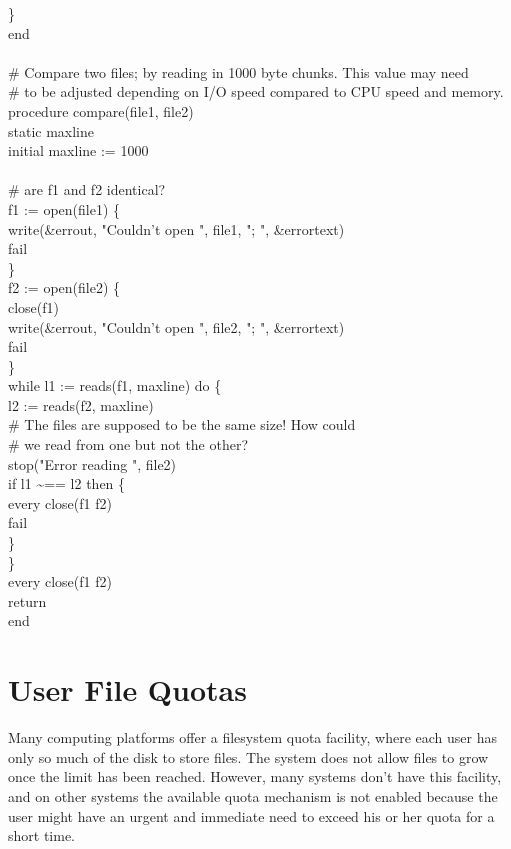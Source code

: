 {\>\>\} \\
end \\
\ \\
\# Compare two files; by reading in 1000 byte chunks. This value may need\\
\# to be adjusted depending on I/O speed compared to CPU speed and memory. \\
procedure compare(file1, file2) \\
\>static maxline \\
\>initial maxline := 1000 \\
\ \\
\>\# are f1 and f2 identical? \\
\>f1 := open(file1) {\textbar} \{ \\
\>\>write(\&errout, "Couldn't open ", file1, "; ", \&errortext) \\
\>\>fail \\
\>\>\} \\
\>f2 := open(file2) {\textbar} \{ \\
\>\>close(f1) \\
\>\>write(\&errout, "Couldn't open ", file2, "; ", \&errortext) \\
\>\>fail \\
\>\>\} \\
\>while l1 := reads(f1, maxline) do \{ \\
\>\>l2 := reads(f2, maxline) {\textbar} \\
\>\>\>\# The files are supposed to be the same size! How could \\
\>\>\>\# we read from one but not the other? \\
\>\>\>stop("Error reading ", file2) \\
\>\>if l1 \~{}== l2 then \{ \\
\>\>\>every close(f1 {\textbar} f2) \\
\>\>\>fail \\
\>\>\>\} \\
\>\>\} \\
\>every close(f1 {\textbar} f2) \\
\>return \\
end
}

\section{User File Quotas}

Many computing platforms offer a filesystem quota facility,
where each user has only so much of the disk to store files. The
system does not allow files to grow once the
limit has been reached. However, many systems don't
have this facility, and on other systems the available quota mechanism
is not enabled because the user might have an urgent and immediate need
to exceed his or her quota for a short time.

